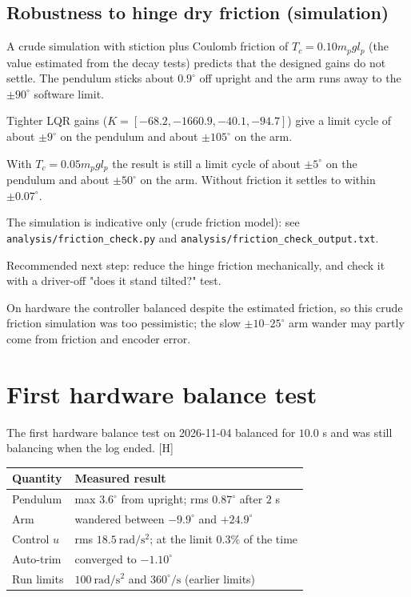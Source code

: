 \documentclass[11pt,a4paper]{article}
\begin{document}
\subsection{Robustness to hinge dry friction (simulation)}

A crude simulation with stiction plus Coulomb friction of $T_c=0.10 m_p g l_p$ (the value estimated from the decay tests) predicts that the designed gains do not settle. The pendulum sticks about $0.9^\circ$ off upright and the arm runs away to the $\pm90^\circ$ software limit.

Tighter LQR gains ($K=[-68.2,-1660.9,-40.1,-94.7]$) give a limit cycle of about $\pm9^\circ$ on the pendulum and about $\pm105^\circ$ on the arm.

With $T_c=0.05 m_p g l_p$ the result is still a limit cycle of about $\pm5^\circ$ on the pendulum and about $\pm50^\circ$ on the arm. Without friction it settles to within $\pm0.07^\circ$.

The simulation is indicative only (crude friction model): see \texttt{analysis/friction\_check.py} and \texttt{analysis/friction\_check\_output.txt}.

Recommended next step: reduce the hinge friction mechanically, and check it with a driver-off "does it stand tilted?" test.

On hardware the controller balanced despite the estimated friction, so this crude friction simulation was too pessimistic; the slow $\pm10$--$25^\circ$ arm wander may partly come from friction and encoder error.

\section{First hardware balance test}

The first hardware balance test on 2026-11-04 balanced for $10.0$ s and was still balancing when the log ended. [H]

\begin{center}
\begin{tabular}{ll}
\toprule
Quantity & Measured result \\
\midrule
Pendulum & max $3.6^\circ$ from upright; rms $0.87^\circ$ after $2$ s \\
Arm & wandered between $-9.9^\circ$ and $+24.9^\circ$ \\
Control $u$ & rms $18.5\ \mathrm{rad/s^2}$; at the limit $0.3\%$ of the time \\
Auto-trim & converged to $-1.10^\circ$ \\
Run limits & $100\ \mathrm{rad/s^2}$ and $360^\circ/\mathrm{s}$ (earlier limits) \\
\bottomrule
\end{tabular}
\end{center}
\end{document}
